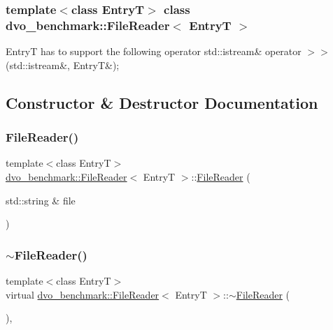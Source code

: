 \subsubsection*{template$<$class EntryT$>$\newline
class dvo\+\_\+benchmark\+::\+File\+Reader$<$ Entry\+T $>$}

EntryT has to support the following operator std\+::istream\& operator $>$$>$(std\+::istream\&, Entry\+T\&); 

\subsection{Constructor \& Destructor Documentation}
\mbox{\label{classdvo__benchmark_1_1_file_reader_a4106b3318059b0f2a8587ee1457b0472}} 
\subsubsection{\texorpdfstring{File\+Reader()}{FileReader()}}
{\footnotesize\ttfamily template$<$class EntryT$>$ \\
\mbox{\hyperlink{classdvo__benchmark_1_1_file_reader}{dvo\+\_\+benchmark\+::\+File\+Reader}}$<$ EntryT $>$\+::\mbox{\hyperlink{classdvo__benchmark_1_1_file_reader}{File\+Reader}} (\begin{DoxyParamCaption}\item[{std\+::string \&}]{file }\end{DoxyParamCaption})\hspace{0.3cm}{\ttfamily [inline]}}

\mbox{\label{classdvo__benchmark_1_1_file_reader_a1cccea52d55942eb1cbab0ae2a856914}} 
\subsubsection{\texorpdfstring{$\sim$\+File\+Reader()}{~FileReader()}}
{\footnotesize\ttfamily template$<$class EntryT$>$ \\
virtual \mbox{\hyperlink{classdvo__benchmark_1_1_file_reader}{dvo\+\_\+benchmark\+::\+File\+Reader}}$<$ EntryT $>$\+::$\sim$\mbox{\hyperlink{classdvo__benchmark_1_1_file_reader}{File\+Reader}} (\begin{DoxyParamCaption}{ }\end{DoxyParamCaption})\hspace{0.3cm}{\ttfamily [inline]}, {\ttfamily [virtual]}}



